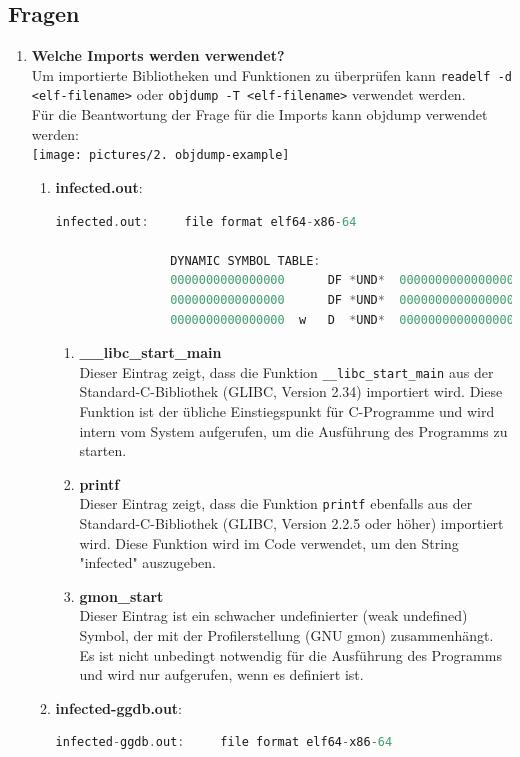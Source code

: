 \documentclass{article}
\begin{document}
	\subsection*{Fragen}
	\begin{enumerate}
		\item \textbf{Welche Imports werden verwendet?}\\
		Um importierte Bibliotheken und Funktionen zu überprüfen kann \texttt{readelf -d <elf-filename>} oder \texttt{objdump -T <elf-filename>} verwendet werden.\\
		Für die Beantwortung der Frage für die Imports kann objdump verwendet werden:\\
		\texttt{[image: pictures/2. objdump-example]}\\	
		\begin{enumerate}
			\item \textbf{infected.out}:\\
			\begin{lstlisting}[language=c]
				infected.out:     file format elf64-x86-64
				
				DYNAMIC SYMBOL TABLE:
				0000000000000000      DF *UND*  0000000000000000 (GLIBC_2.34) __libc_start_main
				0000000000000000      DF *UND*  0000000000000000 (GLIBC_2.2.5) printf
				0000000000000000  w   D  *UND*  0000000000000000  Base        __gmon_start__
			\end{lstlisting}
			\begin{enumerate}
				\item \textbf{\_\_libc\_start\_main}\\
				Dieser Eintrag zeigt, dass die Funktion \texttt{\_\_libc\_start\_main} aus der Standard-C-Bibliothek (GLIBC, Version 2.34) importiert wird. Diese Funktion ist der übliche Einstiegspunkt für C-Programme und wird intern vom System aufgerufen, um die Ausführung des Programms zu starten.
				\item \textbf{printf}\\
				Dieser Eintrag zeigt, dass die Funktion \texttt{printf} ebenfalls aus der Standard-C-Bibliothek (GLIBC, Version 2.2.5 oder höher) importiert wird. Diese Funktion wird im Code verwendet, um den String "infected" auszugeben.
				\item \textbf{gmon\_start}\\
				Dieser Eintrag ist ein schwacher undefinierter (weak undefined) Symbol, der mit der Profilerstellung (GNU gmon) zusammenhängt. Es ist nicht unbedingt notwendig für die Ausführung des Programms und wird nur aufgerufen, wenn es definiert ist.
			\end{enumerate}
			\item \textbf{infected-ggdb.out}:\\
			\begin{lstlisting}[language=c]
				infected-ggdb.out:     file format elf64-x86-64
				

\end{lstlisting}
\end{enumerate}
\end{enumerate}
\end{document}
